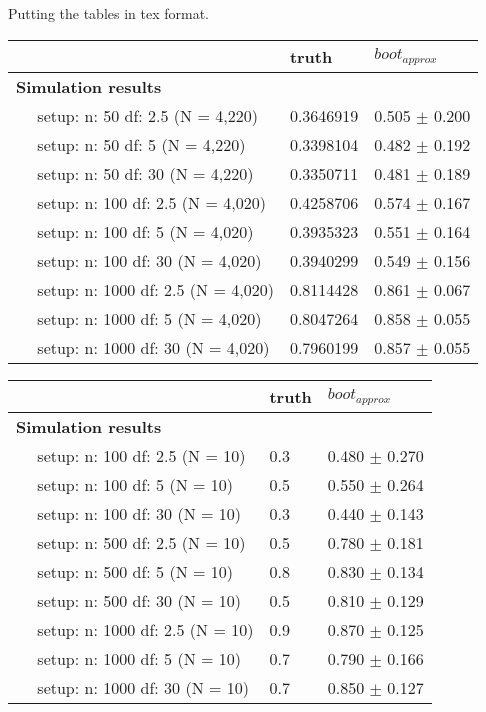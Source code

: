 \documentclass{article}
\begin{document}
Putting the tables in tex format.

\begin{tabular}{l|l|l}
    \hline
    ~ & truth & $boot_{approx}$ \\
    \hline
    \bf{Simulation results} & ~ & ~\\
    \hline
    ~~ setup: n: 50 df: 2.5 (N = 4,220) & 0.3646919 & 0.505 $\pm$ 0.200\\
    \hline
    ~~ setup: n: 50 df: 5 (N = 4,220) & 0.3398104 & 0.482 $\pm$ 0.192\\
    \hline
    ~~ setup: n: 50 df: 30 (N = 4,220) & 0.3350711 & 0.481 $\pm$ 0.189\\
    \hline
    ~~ setup: n: 100 df: 2.5 (N = 4,020) & 0.4258706 & 0.574 $\pm$ 0.167\\
    \hline
    ~~ setup: n: 100 df: 5 (N = 4,020) & 0.3935323 & 0.551 $\pm$ 0.164\\
    \hline
    ~~ setup: n: 100 df: 30 (N = 4,020) & 0.3940299 & 0.549 $\pm$ 0.156\\
    \hline
    ~~ setup: n: 1000 df: 2.5 (N = 4,020) & 0.8114428 & 0.861 $\pm$ 0.067\\
    \hline
    ~~ setup: n: 1000 df: 5 (N = 4,020) & 0.8047264 & 0.858 $\pm$ 0.055\\
    \hline
    ~~ setup: n: 1000 df: 30 (N = 4,020) & 0.7960199 & 0.857 $\pm$ 0.055\\
    \hline
\end{tabular}


\begin{tabular}{l|l|l}
    \hline
     & truth & $boot_{approx}$\\
    \hline
    \bf{Simulation results} & ~ & ~\\
    \hline
    ~~ setup: n: 100 df: 2.5 (N = 10) & 0.3 & 0.480 $\pm$ 0.270\\
    \hline
    ~~ setup: n: 100 df: 5 (N = 10) & 0.5 & 0.550 $\pm$ 0.264\\
    \hline
    ~~ setup: n: 100 df: 30 (N = 10) & 0.3 & 0.440 $\pm$ 0.143\\
    \hline
    ~~ setup: n: 500 df: 2.5 (N = 10) & 0.5 & 0.780 $\pm$ 0.181\\
    \hline
    ~~ setup: n: 500 df: 5 (N = 10) & 0.8 & 0.830 $\pm$ 0.134\\
    \hline
    ~~ setup: n: 500 df: 30 (N = 10) & 0.5 & 0.810 $\pm$ 0.129\\
    \hline
    ~~ setup: n: 1000 df: 2.5 (N = 10) & 0.9 & 0.870 $\pm$ 0.125\\
    \hline
    ~~ setup: n: 1000 df: 5 (N = 10) & 0.7 & 0.790 $\pm$ 0.166\\
    \hline
    ~~ setup: n: 1000 df: 30 (N = 10) & 0.7 & 0.850 $\pm$ 0.127\\
    \hline
    \end{tabular}
\end{document}

